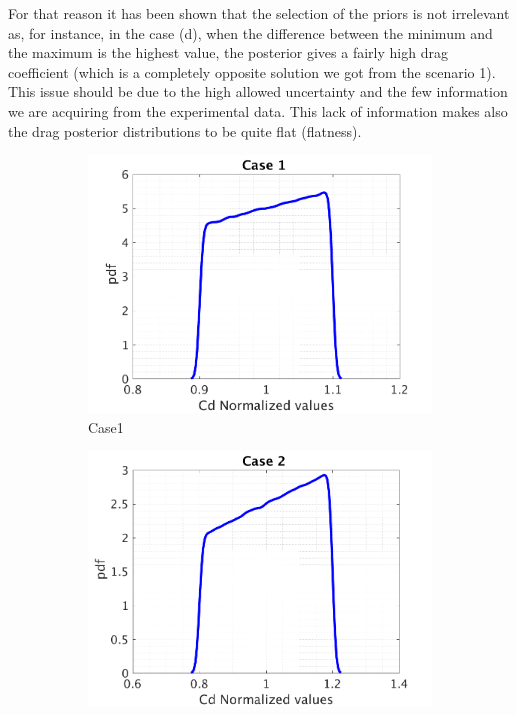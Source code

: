 \documentclass{article}
\begin{document}
\par
For that reason it has been shown that the selection of the priors is not irrelevant as, for instance, in the case (d), when the difference between the minimum and the maximum is  the highest value, the posterior gives a fairly high drag coefficient (which is a completely opposite solution we got from the scenario 1). This issue should be due to the high allowed uncertainty and the few information we are acquiring from the experimental data. This lack of information makes also the drag posterior distributions to be quite flat (flatness).




\begin{figure}[H]
\captionsetup[subfigure]{justification=centering}
\begin{center}
  \begin{subfigure}{0.4\textwidth}
    \centering\includegraphics[width=1.1\textwidth,keepaspectratio]{images/inverse_problem/infer_drag/case1/cdraw_PDF.png}
    \caption{\centering Case1}
  \end{subfigure}
   \begin{subfigure}{0.4\textwidth}
    \centering\includegraphics[width=1.1\textwidth,keepaspectratio]{images/inverse_problem/infer_drag/case2/cdraw_PDF.png}

\end{subfigure}
\end{center}
\end{figure}
\end{document}
